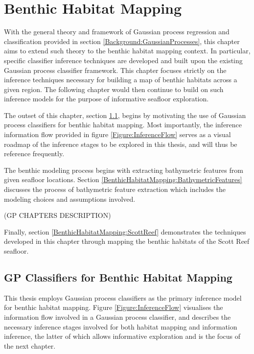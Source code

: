 \chapter{Benthic Habitat Mapping}
\label{BenthicHabitatMapping}
	
	 With the general theory and framework of Gaussian process regression and classification provided in section \ref{Background:GaussianProcesses}, this chapter aims to extend such theory to the benthic habitat mapping context. In particular, specific classifier inference techniques are developed and built upon the existing Gaussian process classifier framework. This chapter focuses strictly on the inference techniques necessary for building a map of benthic habitats across a given region. The following chapter would then continue to build on such inference models for the purpose of informative seafloor exploration. 
	 
	 The outset of this chapter, section \ref{BenthicHabitatMapping:GaussianProcessClassifiers}, begins by motivating the use of Gaussian process classifiers for benthic habitat mapping. Most importantly, the inference information flow provided in figure \ref{Figure:InferenceFlow} serves as a visual roadmap of the inference stages to be explored in this thesis, and will thus be reference frequently.
	 
	 The benthic modeling process begins with extracting bathymetric features from given seafloor locations. Section \ref{BenthicHabitatMapping:BathymetricFeatures} discusses the process of bathymetric feature extraction which includes the modeling choices and assumptions involved. 
	 
	 (GP CHAPTERS DESCRIPTION)
	 
	 Finally, section \ref{BenthicHabitatMapping:ScottReef} demonstrates the techniques developed in this chapter through mapping the benthic habitats of the Scott Reef seafloor. 
				
	\section{GP Classifiers for Benthic Habitat Mapping}
	\label{BenthicHabitatMapping:GaussianProcessClassifiers}
		
		This thesis employs Gaussian process classifiers as the primary inference model for benthic habitat mapping. Figure \ref{Figure:InferenceFlow} visualises the information flow involved in a Gaussian process classifier, and describes the necessary inference stages involved for both habitat mapping and information inference, the latter of which allows informative exploration and is the focus of the next chapter.
		
